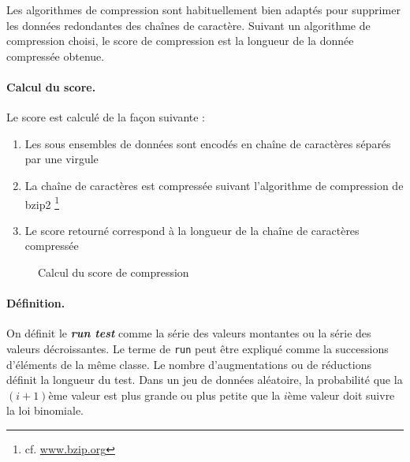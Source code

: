 Les algorithmes de compression sont habituellement bien adaptés pour supprimer les données redondantes des chaînes de caractère. Suivant un algorithme de compression choisi, le score de compression est la longueur de la donnée compressée obtenue. 

\paragraph{Calcul du score.\\}
Le score est calculé de la façon suivante :
\begin{enumerate}
\item Les sous ensembles de données sont encodés en chaîne de caractères séparés par une virgule
\item La chaîne de caractères est compressée suivant l'algorithme de compression de bzip2 \footnote{cf. \url{www.bzip.org}}
\item Le score retourné correspond à la longueur de la chaîne de caractères compressée
\end{enumerate}

\begin{figure}[H]
\begin{center}
\end{center}
\caption{Calcul du score de compression}
\end{figure}

\paragraph{Définition.\\}
On définit le \textbf{\textit{run test}} comme la série des valeurs montantes ou la série des valeurs décroissantes. Le terme de \texttt{run} peut être expliqué comme la successions d'éléments de la même classe. Le nombre d'augmentations ou de réductions définit la longueur du test. Dans un jeu de données aléatoire, la probabilité que la $(i+1)$ème valeur est plus grande ou plus petite que la $i$ème valeur doit suivre la loi binomiale.\\

